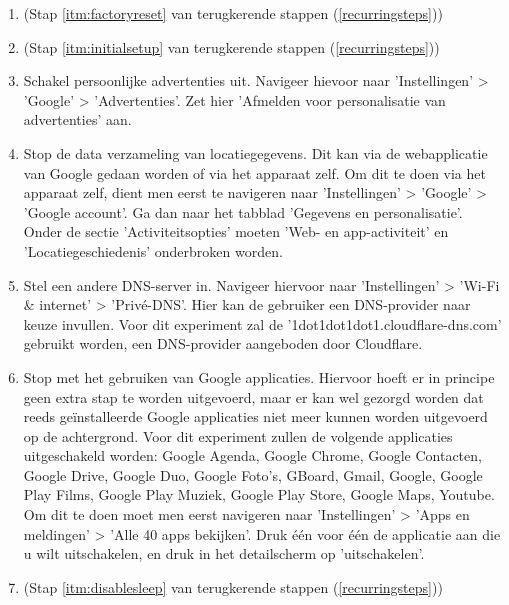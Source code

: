 \begin{enumerate}
    \item 
     (Stap \ref{itm:factoryreset} van terugkerende stappen (\ref{recurringsteps}))
    
    \item 
     (Stap \ref{itm:initialsetup} van terugkerende stappen (\ref{recurringsteps}))
    
    \item Schakel persoonlijke advertenties uit. Navigeer hievoor naar 'Instellingen' > 'Google' > 'Advertenties'. Zet hier 'Afmelden voor personalisatie van advertenties' aan.
    
    \item Stop de data verzameling van locatiegegevens. Dit kan via de webapplicatie van Google gedaan worden of via het apparaat zelf. Om dit te doen via het apparaat zelf, dient men eerst te navigeren naar 'Instellingen' > 'Google' > 'Google account'. Ga dan naar het tabblad 'Gegevens en personalisatie'. Onder de sectie 'Activiteitsopties' moeten 'Web- en app-activiteit' en 'Locatiegeschiedenis' onderbroken worden.
    
    \item Stel een andere DNS-server in. Navigeer hiervoor naar 'Instellingen' > 'Wi-Fi \& internet' > 'Privé-DNS'. Hier kan de gebruiker een DNS-provider naar keuze invullen. Voor dit experiment zal de '1dot1dot1dot1.cloudflare-dns.com' gebruikt worden, een DNS-provider aangeboden door Cloudflare.
    
    \item Stop met het gebruiken van Google applicaties. Hiervoor hoeft er in principe geen extra stap te worden uitgevoerd, maar er kan wel gezorgd worden dat reeds geïnstalleerde Google applicaties niet meer kunnen worden uitgevoerd op de achtergrond. Voor dit experiment zullen de volgende applicaties uitgeschakeld worden: Google Agenda, Google Chrome, Google Contacten, Google Drive, Google Duo, Google Foto's, GBoard, Gmail, Google, Google Play Films, Google Play Muziek, Google Play Store, Google Maps, Youtube. Om dit te doen moet men eerst navigeren naar 'Instellingen' > 'Apps en meldingen' > 'Alle 40 apps bekijken'. Druk één voor één de applicatie aan die u wilt uitschakelen, en druk in het detailscherm op 'uitschakelen'.
    
    \item 
     (Stap \ref{itm:disablesleep} van terugkerende stappen (\ref{recurringsteps}))
\end{enumerate}
    
